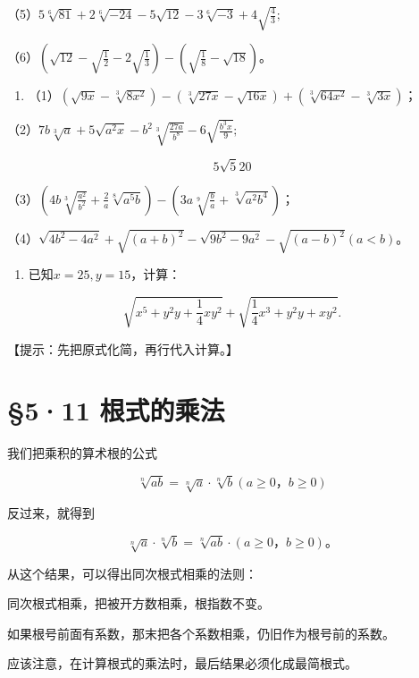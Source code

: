 （5）\(5\sqrt[6]{81} + 2\sqrt[6]{-24} - 5\sqrt{12} - 3\sqrt[6]{-3} + 4\sqrt{\frac{4}{3}};\)

（6）\(\left(\sqrt{12} - \sqrt{\frac{1}{2}} - 2\sqrt{\frac{1}{3}}\right) - \left(\sqrt{\frac{1}{8}} - \sqrt{18}\right)\)。

\begin{enumerate}[start=3]
\item
  （1）\((\sqrt{9x} - \sqrt[3]{8x^2}) - (\sqrt[3]{27x} - \sqrt{16x}) + (\sqrt[3]{64x^2} - \sqrt[3]{3x})\)；
\end{enumerate}

（2）\(7b\sqrt[3]{a} + 5\sqrt{a^2x} - b^2\sqrt[3]{\frac{27a}{b^8}} - 6\sqrt{\frac{b^3x}{9}};\)

\[
5 \sqrt {5} 20
\]

（3）\(\left(4b\sqrt[3]{\frac{a^2}{b^2}} + \frac{2}{a}\sqrt[8]{a^5b}\right) - \left(3a\sqrt[9]{\frac{b}{a}} + \sqrt[3]{a^2b^4}\right)\)；

（4）\(\sqrt{4b^2 - 4a^2} + \sqrt{(a + b)^2} - \sqrt{9b^2 - 9a^2} - \sqrt{(a - b)^2} (a < b)\)。

\begin{enumerate}[start=4]
\item
  已知\(x = 25, y = 15\)，计算：
\end{enumerate}

\[
\sqrt {x ^ {5} + y ^ {2} y + \frac{1}{4} x y ^ {2}} + \sqrt {\frac{1}{4} x ^ {3} + y ^ {2} y + x y ^ {2}}.
\]

【提示：先把原式化简，再行代入计算。】

\section{§5·11 根式的乘法}

我们把乘积的算术根的公式

\[
\sqrt[n]{a b} = \sqrt[n]{a} \cdot \sqrt[n]{b} (a \geqslant 0\text{，} b \geqslant 0)
\]

反过来，就得到

\[
\sqrt[n]{a} \cdot \sqrt[n]{b} = \sqrt[n]{a b} \cdot (a \geqslant 0\text{，} b \geqslant 0)\text{。}
\]

从这个结果，可以得出同次根式相乘的法则：

同次根式相乘，把被开方数相乘，根指数不变。

如果根号前面有系数，那末把各个系数相乘，仍旧作为根号前的系数。

应该注意，在计算根式的乘法时，最后结果必须化成最简根式。

